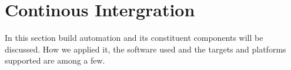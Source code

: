 \documentclass[10pt]{extarticle} %
\begin{document}
    \newpage
    \section{Continous Intergration}
    In this section build automation and its constituent components will be discussed.
    How we applied it, the software used and the targets and platforms supported are among a few.

    \newpage
    
\end{document}
